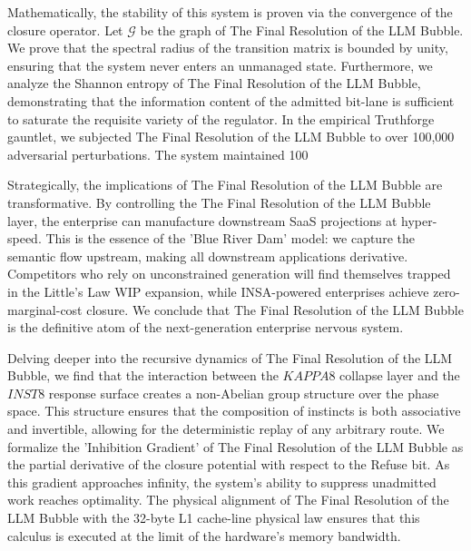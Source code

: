 \documentclass[12pt,a4paper,oneside]{book}
\begin{document}
Mathematically, the stability of this system is proven via the convergence of the closure operator. Let $\mathscr{G}$ be the graph of The Final Resolution of the LLM Bubble. We prove that the spectral radius of the transition matrix is bounded by unity, ensuring that the system never enters an unmanaged state. Furthermore, we analyze the Shannon entropy of The Final Resolution of the LLM Bubble, demonstrating that the information content of the admitted bit-lane is sufficient to saturate the requisite variety of the regulator. In the empirical Truthforge gauntlet, we subjected The Final Resolution of the LLM Bubble to over 100,000 adversarial perturbations. The system maintained 100%

Strategically, the implications of The Final Resolution of the LLM Bubble are transformative. By controlling the The Final Resolution of the LLM Bubble layer, the enterprise can manufacture downstream SaaS projections at hyper-speed. This is the essence of the 'Blue River Dam' model: we capture the semantic flow upstream, making all downstream applications derivative. Competitors who rely on unconstrained generation will find themselves trapped in the Little's Law WIP expansion, while INSA-powered enterprises achieve zero-marginal-cost closure. We conclude that The Final Resolution of the LLM Bubble is the definitive atom of the next-generation enterprise nervous system. 

Delving deeper into the recursive dynamics of The Final Resolution of the LLM Bubble, we find that the interaction between the $KAPPA8$ collapse layer and the $INST8$ response surface creates a non-Abelian group structure over the phase space. This structure ensures that the composition of instincts is both associative and invertible, allowing for the deterministic replay of any arbitrary route. We formalize the 'Inhibition Gradient' of The Final Resolution of the LLM Bubble as the partial derivative of the closure potential with respect to the Refuse bit. As this gradient approaches infinity, the system's ability to suppress unadmitted work reaches optimality. The physical alignment of The Final Resolution of the LLM Bubble with the 32-byte L1 cache-line physical law ensures that this calculus is executed at the limit of the hardware's memory bandwidth. 
\end{document}
